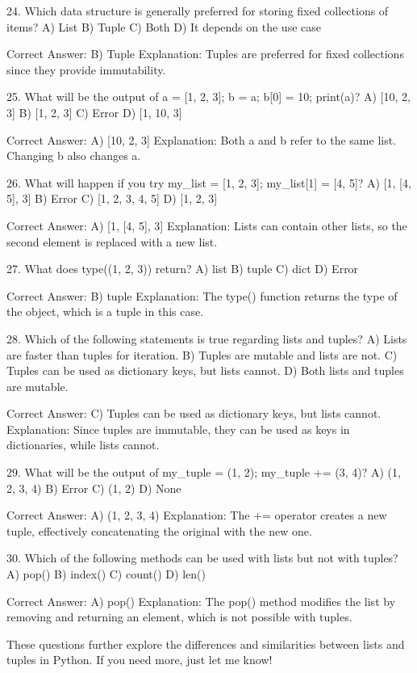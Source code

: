 24. Which data structure is generally preferred for storing fixed collections of items?
A) List
B) Tuple
C) Both
D) It depends on the use case

Correct Answer: B) Tuple
Explanation: Tuples are preferred for fixed collections since they provide immutability.

25. What will be the output of a = [1, 2, 3]; b = a; b[0] = 10; print(a)?
A) [10, 2, 3]
B) [1, 2, 3]
C) Error
D) [1, 10, 3]

Correct Answer: A) [10, 2, 3]
Explanation: Both a and b refer to the same list. Changing b also changes a.

26. What will happen if you try my_list = [1, 2, 3]; my_list[1] = [4, 5]?
A) [1, [4, 5], 3]
B) Error
C) [1, 2, 3, 4, 5]
D) [1, 2, 3]

Correct Answer: A) [1, [4, 5], 3]
Explanation: Lists can contain other lists, so the second element is replaced with a new list.

27. What does type((1, 2, 3)) return?
A) list
B) tuple
C) dict
D) Error

Correct Answer: B) tuple
Explanation: The type() function returns the type of the object, which is a tuple in this case.

28. Which of the following statements is true regarding lists and tuples?
A) Lists are faster than tuples for iteration.
B) Tuples are mutable and lists are not.
C) Tuples can be used as dictionary keys, but lists cannot.
D) Both lists and tuples are mutable.

Correct Answer: C) Tuples can be used as dictionary keys, but lists cannot.
Explanation: Since tuples are immutable, they can be used as keys in dictionaries, while lists cannot.

29. What will be the output of my_tuple = (1, 2); my_tuple += (3, 4)?
A) (1, 2, 3, 4)
B) Error
C) (1, 2)
D) None

Correct Answer: A) (1, 2, 3, 4)
Explanation: The += operator creates a new tuple, effectively concatenating the original with the new one.

30. Which of the following methods can be used with lists but not with tuples?
A) pop()
B) index()
C) count()
D) len()

Correct Answer: A) pop()
Explanation: The pop() method modifies the list by removing and returning an element, which is not possible with tuples.

These questions further explore the differences and similarities between lists and tuples in Python. If you need more, just let me know!






